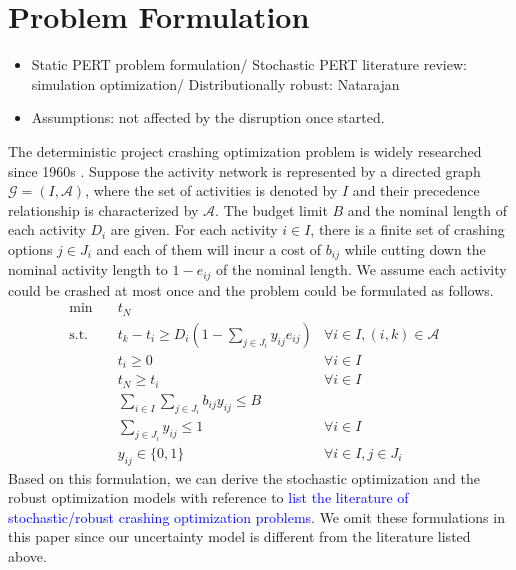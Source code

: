 \documentclass[11pt]{article}
\begin{document}
\section{Problem Formulation} \label{sec:formulation}
	\begin{itemize}
		\item Static PERT problem formulation/ Stochastic PERT literature review: simulation optimization/ Distributionally robust: Natarajan
		\item Assumptions: not affected by the disruption once started.
	\end{itemize}
	The deterministic project crashing optimization problem is widely researched since 1960s \cite{fulkerson1961network, kelley1961criticalpath}. Suppose the activity network is represented by a directed graph \(\mathcal{G} = (I,\mathcal{A})\), where the set of activities is denoted by \(I\) and their precedence relationship is characterized by \(\mathcal{A}\). The budget limit \(B\) and the nominal length of each activity \(D_i\) are given. For each activity \(i \in I\), there is a finite set of crashing options \(j \in J_i\) and each of them will incur a cost of \(b_{ij}\) while cutting down the nominal activity length to \(1 - e_{ij}\) of the nominal length.  We assume each activity could be crashed at most once and the problem could be formulated as follows. 
	\begin{subequations} \label{prob:static}
		\begin{align}
			\min \quad & t_N &\\
			\text{s.t.} \quad & t_k - t_i \geq D_{i}(1 - \sum_{j \in J_i} y_{ij} e_{ij}) & \forall i \in I, (i,k) \in \mathcal{A}\\
			& t_i \geq 0 & \forall i \in I\\
			& t_N \geq t_i & \forall i \in I \\
			& \sum_{i \in I} \sum_{j \in J_i} b_{ij}y_{ij} \leq B & \\
			& \sum_{j \in J_i} y_{ij} \leq 1 & \forall i \in I\\
			& y_{ij} \in \{0,1\} & \forall i \in I, j \in J_i&
		\end{align}
	\end{subequations}
	Based on this formulation, we can derive the stochastic optimization and the robust optimization models with reference to \textcolor{blue}{list the literature of stochastic/robust crashing optimization problems}. We omit these formulations in this paper since our uncertainty model is different from the literature listed above.\\
\end{document}
